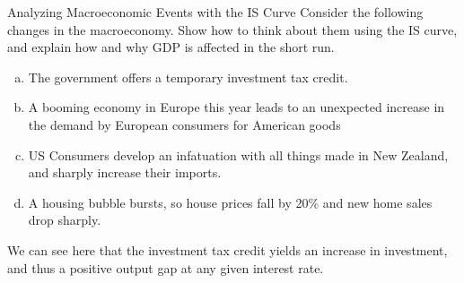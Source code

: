 \documentclass[8pt]{extarticle}
\begin{document}
  \begin{problem}{Analyzing Macroeconomic Events with the IS Curve}
    Consider the following changes in the macroeconomy. Show how to think about them using the IS curve, and explain how and why GDP is affected in the short run.
    \begin{enumerate}[(a)]
      \item The government offers a temporary investment tax credit.
      \item A booming economy in Europe this year leads to an unexpected increase in the demand by European consumers for American goods
      \item US Consumers develop an infatuation with all things made in New Zealand, and sharply increase their imports.
      \item A housing bubble bursts, so house prices fall by 20\% and new home sales drop sharply.
    \end{enumerate}
    \tcblower
    \begin{tcolorbox}[colback = white, title = (a), breakable]
      \begin{center}
      \end{center}
      We can see here that the investment tax credit yields an increase in investment, and thus a positive output gap at any given interest rate.
    \end{tcolorbox}
    \begin{tcolorbox}[colback = white, title = (b), breakable]
      \begin{center}
      \end{center}

\end{tcolorbox}
\end{problem}
\end{document}
